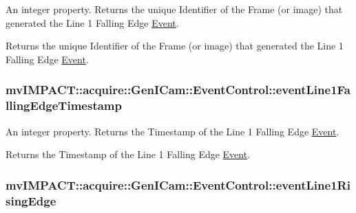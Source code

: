 An integer property. Returns the unique Identifier of the Frame (or image) that generated the Line 1 Falling Edge \hyperlink{classmv_i_m_p_a_c_t_1_1acquire_1_1_event}{Event}. 

Returns the unique Identifier of the Frame (or image) that generated the Line 1 Falling Edge \hyperlink{classmv_i_m_p_a_c_t_1_1acquire_1_1_event}{Event}. \hypertarget{classmv_i_m_p_a_c_t_1_1acquire_1_1_gen_i_cam_1_1_event_control_aa22f4daff35085703f5e7bb8c1a97f2d}{
\subsubsection[{event\+Line1\+Falling\+Edge\+Timestamp}]{ mv\+I\+M\+P\+A\+C\+T\+::acquire\+::\+Gen\+I\+Cam\+::\+Event\+Control\+::event\+Line1\+Falling\+Edge\+Timestamp}}\label{classmv_i_m_p_a_c_t_1_1acquire_1_1_gen_i_cam_1_1_event_control_aa22f4daff35085703f5e7bb8c1a97f2d}


An integer property. Returns the Timestamp of the Line 1 Falling Edge \hyperlink{classmv_i_m_p_a_c_t_1_1acquire_1_1_event}{Event}. 

Returns the Timestamp of the Line 1 Falling Edge \hyperlink{classmv_i_m_p_a_c_t_1_1acquire_1_1_event}{Event}. \hypertarget{classmv_i_m_p_a_c_t_1_1acquire_1_1_gen_i_cam_1_1_event_control_ad8750a4927c8d0ecca363c8ebc9949c0}{
\subsubsection[{event\+Line1\+Rising\+Edge}]{ mv\+I\+M\+P\+A\+C\+T\+::acquire\+::\+Gen\+I\+Cam\+::\+Event\+Control\+::event\+Line1\+Rising\+Edge}}\label{classmv_i_m_p_a_c_t_1_1acquire_1_1_gen_i_cam_1_1_event_control_ad8750a4927c8d0ecca363c8ebc9949c0}



